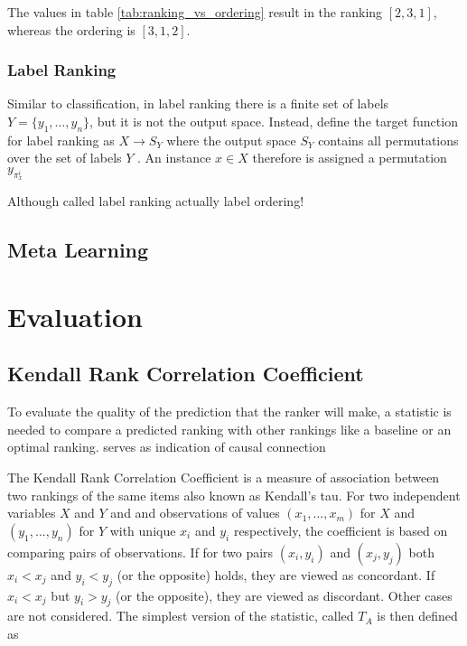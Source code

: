 The values in table \ref{tab:ranking_vs_ordering} result in the ranking $[2,3,1]$, whereas the ordering is $[3,1,2]$.

\subsubsection{Label Ranking}
Similar to classification, in label ranking there is a finite set of labels $Y=\lbrace y_1,\dots,y_n \rbrace$, but it is not the output space. Instead, \citeauthor{DBLP:books/daglib/0025729} define the target function for label ranking as $X\rightarrow S_Y$ where the output space $S_Y$ contains all permutations over the set of labels $Y$ \cite{DBLP:books/daglib/0025729}. An instance $x \in X$ therefore is assigned a permutation $y_{\pi_x^i}$

Although called label ranking actually label ordering!

\subsection{Meta Learning}


\section{Evaluation}

\subsection{Kendall Rank Correlation Coefficient}
To evaluate the quality of the prediction that the ranker will make, a statistic is needed to compare a predicted ranking with other rankings like a baseline or an optimal ranking.  serves as indication of causal connection

The Kendall Rank Correlation Coefficient is a measure of association between two rankings of the same items also known as Kendall's tau. For two independent variables $X$ and $Y$ and and observations of values $(x_1,...,x_m)$ for $X$ and $(y_1,...,y_n)$ for $Y$ with unique $x_i$ and $y_i$ respectively, the coefficient is based on comparing pairs of observations. If for two pairs $(x_i,y_i)$ and $(x_j,y_j)$ both $x_i < x_j$ and $y_i < y_j$ (or the opposite) holds, they are viewed as concordant. If $x_i < x_j$ but $y_i > y_j$ (or the opposite), they are viewed as discordant. Other cases are not considered. The simplest version of the statistic, called $T_A$ is then defined as 

